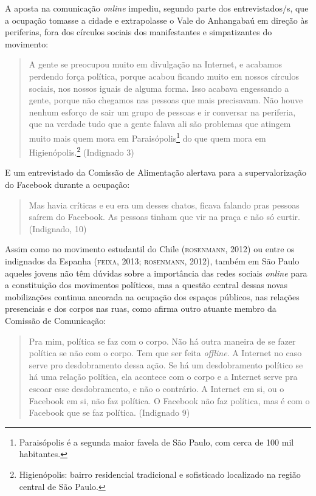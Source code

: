 A aposta na comunicação \emph{online} impediu, segundo parte dos
entrevistados/s, que a ocupação tomasse a cidade e extrapolasse o Vale
do Anhangabaú em direção às periferias, fora dos círculos sociais dos
manifestantes e simpatizantes do movimento:

\begin{quote}
A gente se preocupou muito em divulgação na Internet, e acabamos
perdendo força política, porque acabou ficando muito em nossos círculos
sociais, nos nossos iguais de alguma forma. Isso acabava engessando a
gente, porque não chegamos nas pessoas que mais precisavam. Não houve
nenhum esforço de sair um grupo de pessoas e ir conversar na periferia,
que na verdade tudo que a gente falava ali são problemas que atingem
muito mais quem mora em Paraisópolis\footnote{Paraisópolis é a segunda
  maior favela de São Paulo, com cerca de 100 mil habitantes.} do
que quem mora em Higienópolis.\footnote{Higienópolis: bairro residencial
  tradicional e sofisticado localizado na região central de São Paulo.}
(Indignado 3)
\end{quote}

E um entrevistado da Comissão de Alimentação alertava para a
supervalorização do Facebook durante a ocupação:

\begin{quote}
Mas havia críticas e eu era um desses chatos, ficava falando pras
pessoas saírem do Facebook. As pessoas tinham que vir na praça e não só
curtir. (Indignado, 10)
\end{quote}

Assim como no movimento estudantil do Chile (\textsc{rosenmann}, 2012) ou entre
os indignados da Espanha (\textsc{feixa}, 2013; \textsc{rosenmann}, 2012), também em São
Paulo aqueles jovens não têm dúvidas sobre a importância das redes
sociais \emph{online} para a constituição dos movimentos políticos, mas
a questão central dessas novas mobilizações continua ancorada na
ocupação dos espaços públicos, nas relações presenciais e dos corpos nas
ruas, como afirma outro atuante membro da Comissão de Comunicação:

\begin{quote}
Pra mim, política se faz com o corpo. Não há outra maneira de se
fazer política se não com o corpo. Tem que ser feita \emph{offline}. A
Internet no caso serve pro desdobramento dessa ação. Se há um
desdobramento político se há uma relação política, ela acontece com o
corpo e a Internet serve pra escoar esse desdobramento, e não o
contrário. A Internet em si, ou o Facebook em si, não faz política. O
Facebook não faz política, mas é com o Facebook que se faz política.
(Indignado 9)
\end{quote}

